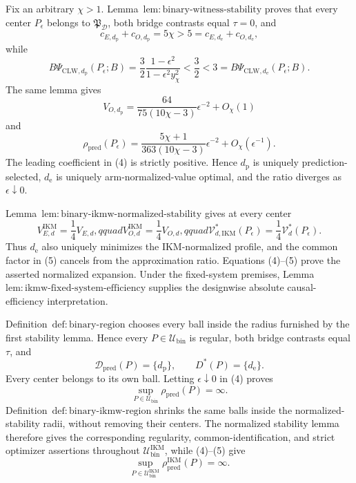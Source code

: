 Fix an arbitrary \(\chi>1\).  Lemma~\(\mathrm{lem{:}binary\text{-}witness\text{-}stability}\) proves that every center \(P_\epsilon\) belongs to \(\mathfrak P_{\mathcal D}\), both bridge contrasts equal \(\tau=0\), and
\[
 c_{E,d_{\mathrm p}}+c_{O,d_{\mathrm p}}=5\chi>5
 =c_{E,d_{\mathrm e}}+c_{O,d_{\mathrm e}},             \tag{1}
\]
while
\[
 B\Psi_{\mathrm{CLW},d_{\mathrm p}}(P_\epsilon;B)
 =\frac32\frac{1-\epsilon^2}{1-\epsilon^2y_\chi^2}
 <\frac32<3
 =B\Psi_{\mathrm{CLW},d_{\mathrm e}}(P_\epsilon;B).   \tag{2}
\]
The same lemma gives
\[
 V_{O,d_{\mathrm p}}
 =\frac{64}{75(10\chi-3)}\epsilon^{-2}+O_\chi(1)       \tag{3}
\]
and
\[
 \rho_{\mathrm{pred}}(P_\epsilon)
 =\frac{5\chi+1}{363(10\chi-3)}\epsilon^{-2}
  +O_\chi(\epsilon^{-1}).                              \tag{4}
\]
The leading coefficient in (4) is strictly positive.  Hence \(d_{\mathrm p}\) is uniquely prediction-selected, \(d_{\mathrm e}\) is uniquely arm-normalized-value optimal, and the ratio diverges as \(\epsilon\downarrow0\).

Lemma~\(\mathrm{lem{:}binary\text{-}ikmw\text{-}normalized\text{-}stability}\) gives at every center
\[
 V_{E,d}^{\mathrm{IKM}}=\frac14V_{E,d},qquad
 V_{O,d}^{\mathrm{IKM}}=\frac14V_{O,d},qquad
 \mathcal V_{d,\mathrm{IKM}}^*(P_\epsilon)
 =\frac14\mathcal V_d^*(P_\epsilon).                  \tag{5}
\]
Thus \(d_{\mathrm e}\) also uniquely minimizes the IKM-normalized profile, and the common factor in (5) cancels from the approximation ratio.  Equations (4)--(5) prove the asserted normalized expansion.  Under the fixed-system premises, Lemma~\(\mathrm{lem{:}ikmw\text{-}fixed\text{-}system\text{-}efficiency}\) supplies the designwise absolute causal-efficiency interpretation.

Definition~\(\mathrm{def{:}binary\text{-}region}\) chooses every ball inside the radius furnished by the first stability lemma.  Hence every \(P\in\mathcal U_{\mathrm{bin}}\) is regular, both bridge contrasts equal \(\tau\), and
\[
 \mathcal D_{\mathrm{pred}}(P)=\{d_{\mathrm p}\},
 \qquad D^*(P)=\{d_{\mathrm e}\}.                     \tag{6}
\]
Every center belongs to its own ball.  Letting \(\epsilon\downarrow0\) in (4) proves
\[
 \sup_{P\in\mathcal U_{\mathrm{bin}}}
 \rho_{\mathrm{pred}}(P)=\infty.                      \tag{7}
\]
Definition~\(\mathrm{def{:}binary\text{-}ikmw\text{-}region}\) shrinks the same balls inside the normalized-stability radii, without removing their centers.  The normalized stability lemma therefore gives the corresponding regularity, common-identification, and strict optimizer assertions throughout \(\mathcal U_{\mathrm{bin}}^{\mathrm{IKM}}\), while (4)--(5) give
\[
 \sup_{P\in\mathcal U_{\mathrm{bin}}^{\mathrm{IKM}}}
 \rho_{\mathrm{pred}}^{\mathrm{IKM}}(P)=\infty.       \tag{8}
\]

